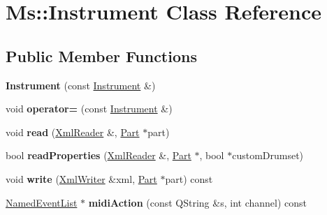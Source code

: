 \hypertarget{class_ms_1_1_instrument}{}\section{Ms\+:\+:Instrument Class Reference}
\label{class_ms_1_1_instrument}
\subsection*{Public Member Functions}
\begin{DoxyCompactItemize}
\item 
\mbox{\label{class_ms_1_1_instrument_ada9dc7b0257938a9ccfd99ed63548005}} 
{\bfseries Instrument} (const \hyperlink{class_ms_1_1_instrument}{Instrument} \&)
\item 
\mbox{\label{class_ms_1_1_instrument_a6ad444f145ae2b79709286b864cd3447}} 
void {\bfseries operator=} (const \hyperlink{class_ms_1_1_instrument}{Instrument} \&)
\item 
\mbox{\label{class_ms_1_1_instrument_a5ce412e4f90eee152d242bfbdec55951}} 
void {\bfseries read} (\hyperlink{class_ms_1_1_xml_reader}{Xml\+Reader} \&, \hyperlink{class_ms_1_1_part}{Part} $\ast$part)
\item 
\mbox{\label{class_ms_1_1_instrument_af228740167f18fa0615dfde9c03ab108}} 
bool {\bfseries read\+Properties} (\hyperlink{class_ms_1_1_xml_reader}{Xml\+Reader} \&, \hyperlink{class_ms_1_1_part}{Part} $\ast$, bool $\ast$custom\+Drumset)
\item 
\mbox{\label{class_ms_1_1_instrument_a6e1df7f82c4eaa0eb998922e6d2ea985}} 
void {\bfseries write} (\hyperlink{class_ms_1_1_xml_writer}{Xml\+Writer} \&xml, \hyperlink{class_ms_1_1_part}{Part} $\ast$part) const
\item 
\mbox{\label{class_ms_1_1_instrument_a9be864c62f7d12f938292d5e8276e0db}} 
\hyperlink{struct_ms_1_1_named_event_list}{Named\+Event\+List} $\ast$ {\bfseries midi\+Action} (const Q\+String \&s, int channel) const
\item 
\mbox{\label{class_ms_1_1_instrument_aed7d2c00f36a4176f098e1fedcc8e77d}} 

\end{DoxyCompactItemize}
